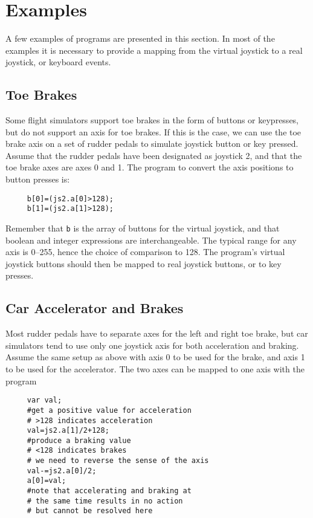 \documentclass{article}
\begin{document}
\section{Examples}
A few examples of programs are presented in this section.
In most of the examples it is necessary to provide a mapping
from the virtual joystick to a real joystick, or keyboard events.
\subsection{Toe Brakes}
Some flight simulators support toe brakes in the form of buttons
or keypresses, but do not support an axis for toe brakes. If this
is the case, we can use the toe brake axis on a set of rudder pedals
to simulate joystick button or key pressed. Assume that the
rudder pedals have been designated as joystick 2, and that the
toe brake axes are axes 0 and 1. The program to convert the
axis positions to button presses is:
\begin{verbatim}
     b[0]=(js2.a[0]>128);
     b[1]=(js2.a[1]>128);
\end{verbatim}
Remember that {\tt b} is the array of buttons for the
virtual joystick, and that boolean and integer expressions
are interchangeable. The typical range for any axis is 0--255,
hence the choice of comparison to 128.
The program's virtual joystick buttons should then be mapped
to real joystick buttons, or to key presses.

\subsection{Car Accelerator and Brakes}
Most rudder pedals have to separate axes for the left and
right toe brake, but car simulators tend to use only one joystick 
axis for both acceleration and braking. Assume the same setup
as above with axis 0 to be used for the brake, and
axis 1 to be used for the accelerator. The two axes can be mapped
to one axis with the program 
\begin{verbatim}
     var val; 
     #get a positive value for acceleration
     # >128 indicates acceleration
     val=js2.a[1]/2+128;     
     #produce a braking value
     # <128 indicates brakes
     # we need to reverse the sense of the axis
     val-=js2.a[0]/2;     
     a[0]=val;
     #note that accelerating and braking at 
     # the same time results in no action
     # but cannot be resolved here
\end{verbatim}
\end{document}
